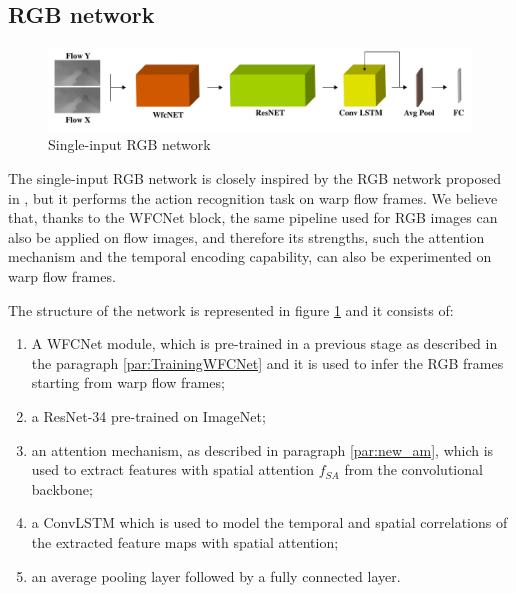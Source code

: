 \documentclass[10pt,twocolumn,letterpaper]{article}
\begin{document}
\subsection{RGB network}
\label{par:our_rgb_network}

\begin{figure}
	\begin{center}
		\includegraphics[width=\textwidth]{schemi/single_stream_img.pdf}		
	\end{center}
	\caption{Single-input RGB network}
	\label{fig:SingleStream}
\end{figure}

The single-input RGB network is closely inspired by the RGB network proposed in \cite{Ego-RNN}, but it performs the action recognition task on warp flow frames.
We believe that, thanks to the WFCNet block, the same pipeline used for RGB images can also be applied on flow images, and therefore its strengths, such the attention mechanism and the temporal encoding capability, can also be experimented on warp flow frames. 

The structure of the network is represented in figure \ref{fig:SingleStream} and it consists of:
\begin{enumerate}
	\item A WFCNet module, which is pre-trained in a previous stage as described in the paragraph \ref{par:TrainingWFCNet} and it is used to infer the RGB frames starting from warp flow frames;
	\item a ResNet-34 pre-trained on ImageNet;
	\item an attention mechanism, as described in paragraph \ref{par:new_am}, which is used to extract features with spatial attention $f_{SA}$ from the convolutional backbone;
	\item a ConvLSTM which is used to model the temporal and spatial correlations of the extracted feature maps with spatial attention;
	\item an average pooling layer followed by a fully connected layer.
\end{enumerate}
\end{document}
